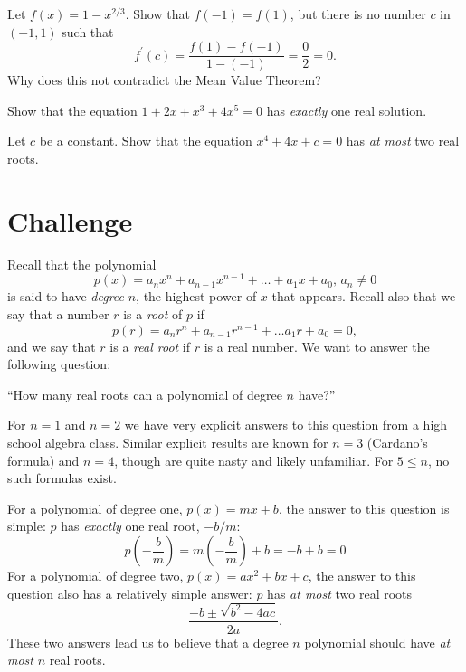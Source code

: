 \documentclass[10pt]{amsart}
\begin{document}
\vspace{1.5in}

\begin{thm}
  Let \(f(x) = 1 - x^{2/3}\).
  Show that \(f(-1) = f(1)\), but there is no number \(c\) in \((-1,1)\) such that
  \[f^\prime(c) = \frac{f(1) - f(-1)}{1 - (-1)} = \frac{0}{2} = 0.\]
  Why does this not contradict the Mean Value Theorem?
\end{thm}

\newpage

\begin{thm}
  Show that the equation \(1 + 2x + x^3 + 4x^5 = 0\) has \textit{exactly} one real solution.
\end{thm}

\vspace{4in}

\begin{thm}
  Let \(c\) be a constant.
  Show that the equation \(x^4 + 4x + c = 0\) has \textit{at most} two real roots.
\end{thm}

\newpage

\section*{Challenge}



Recall that the polynomial
\[p(x) = a_n x^n + a_{n-1} x^{n-1} + \ldots + a_1 x + a_0,\, a_n \neq 0\]
is said to have \textit{degree} \(n\), the highest power of \(x\) that appears.
Recall also that we say that a number \(r\) is a \textit{root} of \(p\) if
\[p(r) = a_nr^n + a_{n-1}r^{n-1} + \ldots a_1 r + a_0 = 0,\]
and we say that \(r\) is a \textit{real root} if \(r\) is a real number.
We want to answer the following question:
\begin{displayquote}
  ``How many real roots can a polynomial of degree \(n\) have?''
\end{displayquote}
For \(n = 1\) and \(n = 2\) we have very explicit answers to this question from a high school algebra class.
Similar explicit results are known for \(n = 3\) (Cardano's formula) and \(n = 4\), though are quite nasty and likely unfamiliar.
For \(5 \leq n\), no such formulas exist.

For a polynomial of degree one, \(p(x) = m x + b\), the answer to this question is simple: \(p\) has \textit{exactly} one real root, \(-b/m\):
\[p\left(-\frac{b}{m}\right) = m\left(-\frac{b}{m}\right) + b = -b + b = 0\]
For a polynomial of degree two, \(p(x) = a x^2 + b x + c\), the answer to this question also has a relatively simple answer: \(p\) has \textit{at most} two real roots
\[\frac{-b \pm \sqrt{b^2 - 4ac}}{2a}.\]
These two answers lead us to believe that a degree \(n\) polynomial should have \textit{at most} \(n\) real roots.
\end{document}
